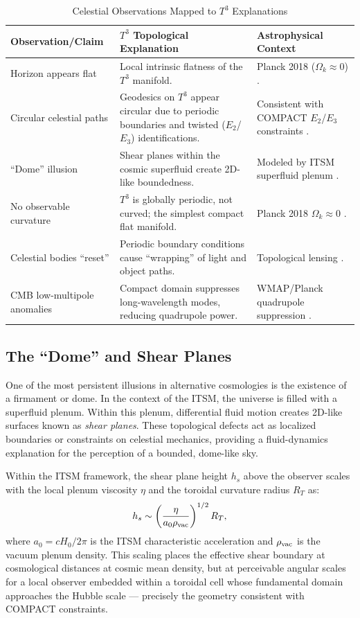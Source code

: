 \documentclass[aps,prd,11pt,onecolumn,superscriptaddress,nofootinbib,floatfix]{revtex4-2}
\begin{document}
\begin{table}[h]
\centering
\caption{Celestial Observations Mapped to $T^3$ Explanations}
\label{tab:mapping}
\begin{tabular}{p{} p{} p{}}
\toprule
\textbf{Observation/Claim} & \textbf{$T^3$ Topological Explanation} & \textbf{Astrophysical Context} \\
\midrule
Horizon appears flat & Local intrinsic flatness of the $T^3$ manifold. & Planck 2018 ($\Omega_k \approx 0$) \cite{planck_2018}. \\
Circular celestial paths & Geodesics on $T^3$ appear circular due to periodic boundaries and twisted ($E_2$/$E_3$) identifications. & Consistent with COMPACT $E_2$/$E_3$ constraints \cite{compact_promise}. \\
``Dome'' illusion & Shear planes within the cosmic superfluid create 2D-like boundedness. & Modeled by ITSM superfluid plenum \cite{itsm_main}. \\
No observable curvature & $T^3$ is globally periodic, not curved; the simplest compact flat manifold. & Planck 2018 $\Omega_k \approx 0$ \cite{planck_2018}. \\
Celestial bodies ``reset'' & Periodic boundary conditions cause ``wrapping'' of light and object paths. & Topological lensing \cite{compact_pt1}. \\
CMB low-multipole anomalies & Compact domain suppresses long-wavelength modes, reducing quadrupole power. & WMAP/Planck quadrupole suppression \cite{compact_eigenmodes}. \\
\bottomrule
\end{tabular}
\end{table}

\subsection{The ``Dome'' and Shear Planes}
One of the most persistent illusions in alternative cosmologies is the existence of a firmament or dome. In the context of the ITSM, the universe is filled with a superfluid plenum. Within this plenum, differential fluid motion creates 2D-like surfaces known as \textit{shear planes}. These topological defects act as localized boundaries or constraints on celestial mechanics, providing a fluid-dynamics explanation for the perception of a bounded, dome-like sky.

Within the ITSM framework, the shear plane height $h_s$ above the observer scales with the local plenum viscosity $\eta$ and the toroidal curvature radius $R_T$ as:
\begin{equation}
h_s \sim \left(\frac{\eta}{a_0 \rho_{\rm vac}}\right)^{1/2} R_T,
\end{equation}
where $a_0 = cH_0/2\pi$ is the ITSM characteristic acceleration and $\rho_{\rm vac}$ is the vacuum plenum density. This scaling places the effective shear boundary at cosmological distances at cosmic mean density, but at perceivable angular scales for a local observer embedded within a toroidal cell whose fundamental domain approaches the Hubble scale --- precisely the geometry consistent with COMPACT constraints.
\end{document}

